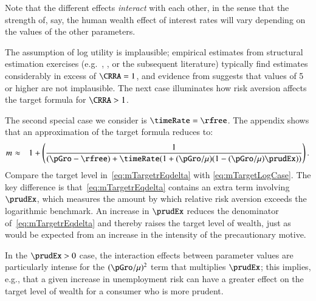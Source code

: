 \documentclass[titlepage,abstract]{\econtex}\newcommand{\texname}{ctDiscrete}
\begin{document}
Note that the different effects \textit{interact} with each other, in the
sense that the strength of, say, the human wealth effect of interest
rates will vary depending on the values of the other parameters.

The assumption of log utility is implausible; empirical estimates from
structural estimation exercises (e.g.\ \cite{gpLifeCycle},
\cite{cagettiWprofiles}, or the subsequent literature) typically
find estimates considerably in excess of $\CRRA = 1$, and evidence
from \cite{bjksPreferences} suggests that values of 5 or higher are
not implausible.  The next case illuminates how risk aversion affects the target formula for $\CRRA>1$.  

The second special case we consider is $\timeRate=\rfree$. 
The appendix shows that an approximation of the target formula reduces to:
\begin{eqnarray}
 \mTarg^{\null} & \approx & 1 + \left(\frac{1}{(\pGro-\rfree)+\timeRate(1+(\pGro/\urate)(1-(\pGro/\urate)\prudEx))}\right) \label{eq:mTargetrEqdelta}
.
\end{eqnarray}
Compare the target level in~\eqref{eq:mTargetrEqdelta} with
\eqref{eq:mTargetLogCase}. The key
difference is that~\eqref{eq:mTargetrEqdelta} contains
an extra term involving $\prudEx$, which measures the amount by which
relative risk aversion exceeds the logarithmic benchmark. An increase in $\prudEx$
reduces the denominator of~\eqref{eq:mTargetrEqdelta} and thereby
raises the target level of wealth, just as would be expected from an
increase in the intensity of the precautionary motive.  

In the $\prudEx>0$ case, the interaction effects between parameter
values are particularly intense for the $(\pGro/\urate)^2$ term that
multiplies $\prudEx$; this implies, e.g., that a given increase in
unemployment risk can have a greater effect on the target level of 
wealth for a consumer who is more prudent.
\end{document}
